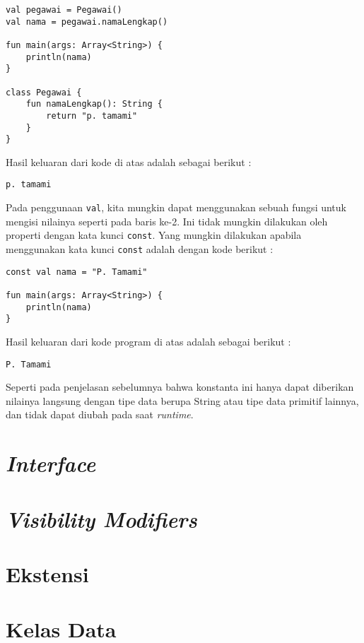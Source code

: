 \begin{lstlisting}
val pegawai = Pegawai()
val nama = pegawai.namaLengkap()

fun main(args: Array<String>) {
	println(nama)
}

class Pegawai {
	fun namaLengkap(): String {
		return "p. tamami"
	}
}
\end{lstlisting}

Hasil keluaran dari kode di atas adalah sebagai berikut :

\begin{lstlisting}
p. tamami
\end{lstlisting}

Pada penggunaan \texttt{val}, kita mungkin dapat menggunakan sebuah fungsi untuk mengisi nilainya seperti pada baris ke-2. Ini tidak mungkin dilakukan oleh properti dengan kata kunci \texttt{const}. Yang mungkin dilakukan apabila menggunakan kata kunci \texttt{const} adalah dengan kode berikut :

\begin{lstlisting}
const val nama = "P. Tamami"

fun main(args: Array<String>) {
	println(nama)
}
\end{lstlisting}

Hasil keluaran dari kode program di atas adalah sebagai berikut :

\begin{lstlisting}
P. Tamami
\end{lstlisting}

Seperti pada penjelasan sebelumnya bahwa konstanta ini hanya dapat diberikan nilainya langsung dengan tipe data berupa String atau tipe data primitif lainnya, dan tidak dapat diubah pada saat \textit{runtime}.

\section{\textit{Interface}}

\section{\textit{Visibility Modifiers}}

\section{Ekstensi}

\section{Kelas Data}

